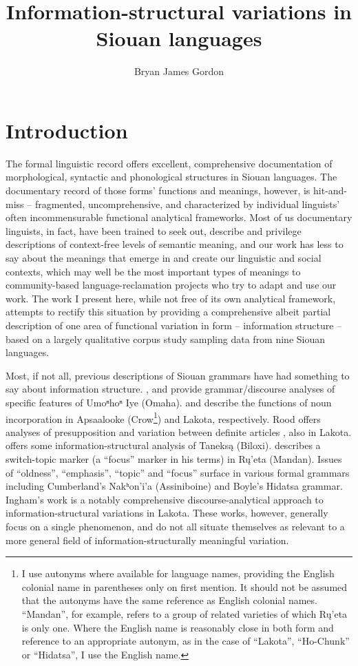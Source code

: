\documentclass[output=paper]{LSP/langsci}
\author{Bryan James Gordon}
\title{Information-structural variations in Siouan languages}
\begin{document}
\section{Introduction}

	The formal linguistic record offers excellent, comprehensive documentation of morphological, syntactic and phonological structures in Siouan languages. The documentary record of those forms’ functions and meanings, however, is hit-and-miss -- fragmented, uncomprehensive, and characterized by individual linguists’ often incommensurable functional analytical frameworks. Most of us documentary linguists, in fact, have been trained to seek out, describe and privilege descriptions of context-free levels of semantic meaning, and our work has less to say about the meanings that emerge in and create our linguistic and social contexts, which may well be the most important types of meanings to community-based language-reclamation projects who try to adapt and use our work. The work I present here, while not free of its own analytical framework, attempts to rectify this situation by providing a comprehensive albeit partial description of one area of functional variation in form -- information structure -- based on a largely qualitative corpus study sampling data from nine Siouan languages.
	
	Most, if not all, previous descriptions of Siouan grammars have had something to say about information structure. \citet{Rudin1998}, \citet{Koontz2003} and \citet{Eschenberg2005} provide grammar/discourse analyses of specific features of Umoⁿhoⁿ Iye (Omaha). \citet[242--260]{Graczyk1991a} and \citet{deReuse1994} describe the functions of noun incorporation in Apsaalooke (Crow\footnote{I use autonyms where available for language names, providing the English colonial name in parentheses only on first mention. It should not be assumed that the autonyms have the same reference as English colonial names. “Mandan”, for example, refers to a group of related varieties of which Rų’eta is only one. Where the English name is reasonably close in both form and reference to an appropriate autonym, as in the case of ``Lakota'', ``Ho-Chunk'' or ``Hidatsa'', I use the English name.}) and Lakota, respectively. Rood offers analyses of presupposition \citeyearpar{Rood1977} and variation between definite articles \citeyearpar{Rood1985}, also in Lakota. \citet{Kaufman2008} offers some information-structural analysis of Taneksą (Biloxi). \citet{Wolvengrey1991} describes a switch-topic marker (a “focus” marker in his terms) in Rų’eta (Mandan). Issues of “oldness”, “emphasis”, “topic” and “focus” surface in various formal grammars including Cumberland’s \citeyearpar{Cumberland2005} Nakʰon’i’a (Assiniboine) and Boyle’s \citeyearpar{Boyle2007} Hidatsa grammar. Ingham’s work \citeyearpar{Ingham2003} is a notably comprehensive discourse-analytical approach to information-structural variations in Lakota. These works, however, generally focus on a single phenomenon, and do not all situate themselves as relevant to a more general field of information-structurally meaningful variation. 
	
\end{document}
